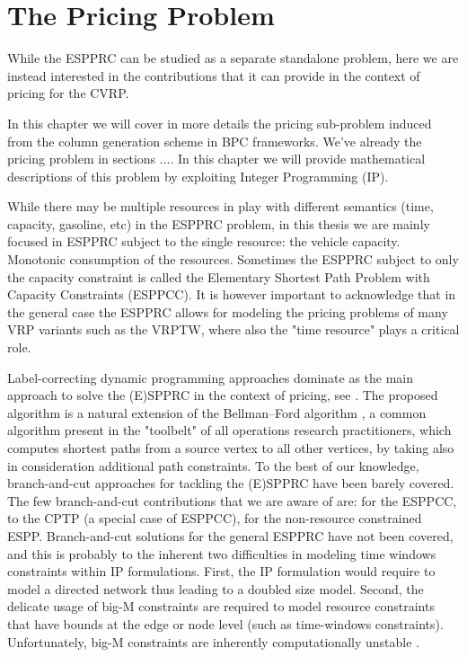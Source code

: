 \chapter{The Pricing Problem}
\label{sec:the-pricing-problem}


While the ESPPRC can be studied as a separate standalone problem,
here we are instead interested in the contributions that it can
provide in the context of pricing for the CVRP.

In this chapter we will cover in more details the pricing sub-problem
induced from the column generation scheme in BPC frameworks.
We've already the pricing problem in sections ....
In this chapter we will provide mathematical descriptions
of this problem by exploiting Integer Programming (IP).

While there may be multiple resources in play with different semantics
(time, capacity, gasoline, etc)
in the ESPPRC problem,
in this thesis we are mainly focused in ESPPRC subject to the single resource: the vehicle capacity.
Monotonic consumption of the resources.
Sometimes the ESPPRC subject to only the capacity constraint is called the Elementary Shortest
Path Problem with Capacity Constraints (ESPPCC).
It is however important to acknowledge that in the general case the ESPPRC allows for modeling
the pricing problems of many VRP variants such as the VRPTW, where also the "time resource"
plays a critical role.

Label-correcting dynamic programming approaches
dominate as the main approach to solve the (E)SPPRC in the context of pricing,
see \cite{desrochers1992, feillet2004, righini2004, righini2006, boland2006, righini2008, pugliese2010, baldacci2011, lozano2013, lozano2016, sadykov2021bucket}.
The proposed algorithm is a natural extension of the Bellman–Ford algorithm \parencite{bellman1958, fordjr1956},
a common algorithm present in the "toolbelt" of all operations research practitioners,
which computes shortest paths from a source vertex to all other vertices,
by taking also in consideration additional path constraints.
To the best of our knowledge,
branch-and-cut approaches for tackling the (E)SPPRC have been barely covered.
The few branch-and-cut contributions that we are aware of are:
\textcite{jepsen2008branchandcut} for the ESPPCC,
\textcite{jepsen2011,jepsen2014} to the CPTP (a special case of ESPPCC),
\textcite{taccari2016} for the non-resource constrained ESPP.
Branch-and-cut solutions for the general ESPPRC have not been covered,
and this is probably to the inherent two difficulties in modeling time windows constraints within IP formulations.
First, the IP formulation would require to model a directed network thus leading to a doubled size model.
Second, the delicate usage of big-M constraints are required to model resource constraints
that have bounds at the edge or node level (such as time-windows constraints).
Unfortunately, big-M constraints are inherently computationally unstable \parencite{jepsen2008branchandcut}.

